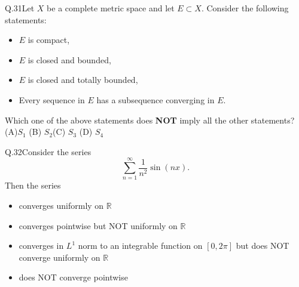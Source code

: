\documentclass{article}
\begin{document}
																																Q.31\quad Let $X$ be a complete metric space and let $E \subset X$. Consider the following statements:
																																\begin{itemize}
																																  \item[$(S_1)$] $E$ is compact,
																																    \item[$(S_2)$] $E$ is closed and bounded,
																																      \item[$(S_3)$] $E$ is closed and totally bounded,
																																        \item[$(S_4)$] Every sequence in $E$ has a subsequence converging in $E$.
																																	\end{itemize}
																																	Which one of the above statements does \textbf{NOT} imply all the other statements?
																																	\vspace{0.5cm}
																																	 \newline \noindent (A)$S_1$ \hspace{2cm} (B) $S_2$\hspace{2cm}(C) $S_3$ \hspace{2cm} (D) $S_4$
																																	 \vspace{0.5cm}

																																	 Q.32\quad Consider the series
																																	 \[
																																	 \sum_{n=1}^{\infty} \frac{1}{n^2} \sin(nx).
																																	 \]
																																	 Then the series
																																	 \begin{itemize}
																																	   \item[(A)] converges uniformly on $\mathbb{R}$
																																	     \item[(B)] converges pointwise but NOT uniformly on $\mathbb{R}$
																																	       \item[(C)] converges in $L^1$ norm to an integrable function on $[0, 2\pi]$ but does NOT converge uniformly on $\mathbb{R}$
																																	         \item[(D)] does NOT converge pointwise
																																		 \end{itemize}

																																		 \vspace{0.5cm}
\end{document}
